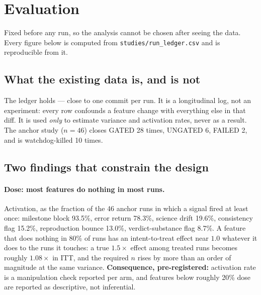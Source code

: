 \section{Evaluation}
\label{sec:evaluation}

Fixed before any run, so the analysis cannot be chosen after seeing the data.
Every figure below is computed from \texttt{studies/run\_ledger.csv} and is
reproducible from it.

\subsection{What the existing data is, and is not}

The ledger holds  --- close to one commit per run. It is a
longitudinal log, not an experiment: every row confounds a feature change with
everything else in that diff. It is used \emph{only} to estimate variance and
activation rates, never as a result. The anchor study ($n=46$) closes GATED 28
times, UNGATED 6, FAILED 2, and is watchdog-killed 10 times.

\subsection{Two findings that constrain the design}

\paragraph{Dose: most features do nothing in most runs.}
Activation, as the fraction of the 46 anchor runs in which a signal fired at
least once: milestone block 93.5\%, error return 78.3\%, science drift 19.6\%,
consistency flag 15.2\%, reproduction bounce 13.0\%, verdict-substance flag
8.7\%. A feature that does nothing in 80\% of runs has an intent-to-treat
effect near $1.0$ whatever it does to the runs it touches: a true $1.5\times$
effect among treated runs becomes roughly $1.08\times$ in ITT, and the required
$n$ rises by more than an order of magnitude at the same variance.
\textbf{Consequence, pre-registered:} activation rate is a manipulation check
reported per arm, and features below roughly 20\% dose are reported as
descriptive, not inferential.

